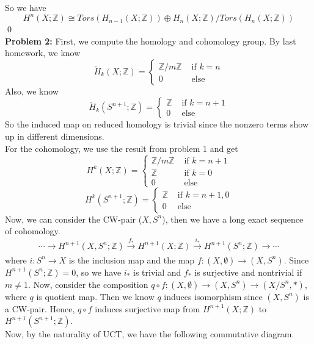 \documentclass[12pt]{amsart}
\newcommand{\Z}{\mathbb{Z}}
\begin{document}
So we have 
\[H^n(X;\Z)\cong Tors(H_{n-1}(X;\Z))\oplus H_n(X;\Z)/Tors(H_n(X;\Z))\]
\qed\\
\textbf{Problem 2:} First, we compute the homology and cohomology group. By last homework, we know 
\[\tilde{H}_k(X;\Z)=\begin{cases}
    \Z/m\Z & \text{ if }k=n\\
    0 & \text{ else}
\end{cases}\]
Also, we know 
\[\tilde{H}_k(S^{n+1};\Z)=\begin{cases}
    \Z & \text{ if }k=n+1\\
    0 & \text{ else}
\end{cases}\]
So the induced map on reduced homology is trivial since the nonzero terms show up in different dimensions. \\
For the cohomology, we use the result from problem 1 and get 
\[H^k(X;\Z)=\begin{cases}
    \Z/m\Z &\text{ if } k=n+1\\
    \Z &\text{ if }k=0\\
    0 &\text{ else}
\end{cases}\]
\[H^k(S^{n+1};\Z)=\begin{cases}
    \Z &\text{ if } k=n+1,0\\
    0 &\text{ else}
\end{cases}\]
Now, we can consider the CW-pair ($X,S^{n}$), then we have a long exact sequence of cohomology.
\[\cdots\to H^{n+1}(X,S^n;\Z)\xrightarrow[]{f_\ast}H^{n+1}(X;\Z)\xrightarrow[]{i_\ast} H^{n+1}(S^n;\Z)\to \cdots\]
where $i:S^n\to X$ is the inclusion map and the map $f:(X,\emptyset)\to (X,S^n)$. Since $H^{n+1}(S^n;\Z)=0$, so we have $i_\ast$ is trivial and $f_\ast$ is surjective and nontrivial if $m\neq 1$. Now, consider the composition $q\circ f:(X,\emptyset)\to (X,S^n)\to (X/S^n,\ast)$, where $q$ is quotient map. Then we know $q$ induces isomorphism since $(X,S^n)$ is a CW-pair. Hence, $q\circ f$ induces surjective map from $H^{n+1}(X;\Z)$ to $H^{n+1}(S^{n+1};\Z)$. \\
Now, by the naturality of UCT, we have the following commutative diagram.
\begin{center}
\end{center}
\end{document}
